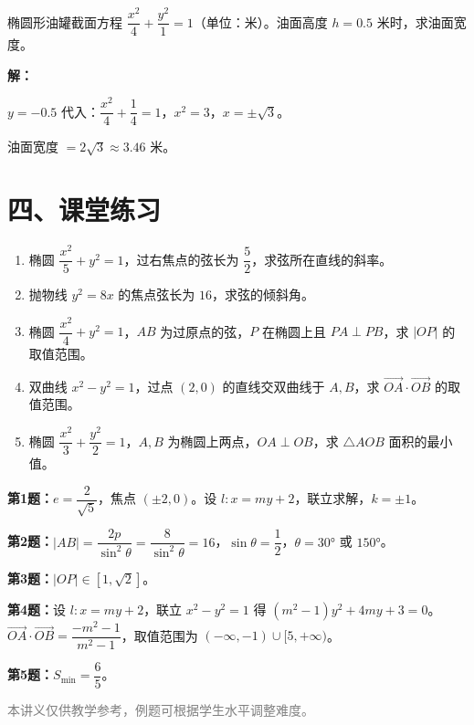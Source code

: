 \documentclass[12pt, a4paper]{ctexart}
\begin{document}
\begin{appbox}[【应用3】油罐截面]
椭圆形油罐截面方程 $\dfrac{x^2}{4}+\dfrac{y^2}{1}=1$（单位：米）。油面高度 $h=0.5$ 米时，求油面宽度。

\textbf{解：}

$y=-0.5$ 代入：$\dfrac{x^2}{4}+\dfrac{1}{4}=1$，$x^2=3$，$x=\pm\sqrt{3}$。

油面宽度 $=2\sqrt{3}\approx\boxed{3.46}$ 米。
\end{appbox}

\section*{\textcolor{tipgreen}{四、课堂练习}}

\begin{enumerate}[leftmargin=2em, itemsep=6pt]
  \item 椭圆 $\dfrac{x^2}{5}+y^2=1$，过右焦点的弦长为 $\dfrac{5}{2}$，求弦所在直线的斜率。
  \item 抛物线 $y^2=8x$ 的焦点弦长为 $16$，求弦的倾斜角。
  \item 椭圆 $\dfrac{x^2}{4}+y^2=1$，$AB$ 为过原点的弦，$P$ 在椭圆上且 $PA\perp PB$，求 $|OP|$ 的取值范围。
  \item 双曲线 $x^2-y^2=1$，过点 $(2,0)$ 的直线交双曲线于 $A,B$，求 $\overrightarrow{OA}\cdot\overrightarrow{OB}$ 的取值范围。
  \item 椭圆 $\dfrac{x^2}{3}+\dfrac{y^2}{2}=1$，$A,B$ 为椭圆上两点，$OA\perp OB$，求 $\triangle AOB$ 面积的最小值。
\end{enumerate}

\vspace{10pt}
\begin{knowledgebox}[参考答案]
\textbf{第1题：}$e=\dfrac{2}{\sqrt{5}}$，焦点 $(\pm 2,0)$。设 $l:x=my+2$，联立求解，$k=\pm 1$。

\textbf{第2题：}$|AB|=\dfrac{2p}{\sin^2\theta}=\dfrac{8}{\sin^2\theta}=16$，$\sin\theta=\dfrac{1}{2}$，$\theta=30°$ 或 $150°$。

\textbf{第3题：}$|OP|\in[1,\sqrt{2}]$。

\textbf{第4题：}设 $l:x=my+2$，联立 $x^2-y^2=1$ 得 $(m^2-1)y^2+4my+3=0$。$\overrightarrow{OA}\cdot\overrightarrow{OB}=\dfrac{-m^2-1}{m^2-1}$，取值范围为 $(-\infty,-1)\cup[5,+\infty)$。

\textbf{第5题：}$S_{\min}=\dfrac{6}{5}$。
\end{knowledgebox}

\vfill
\begin{center}
\small\textcolor{gray}{本讲义仅供教学参考，例题可根据学生水平调整难度。}
\end{center}
\end{document}
